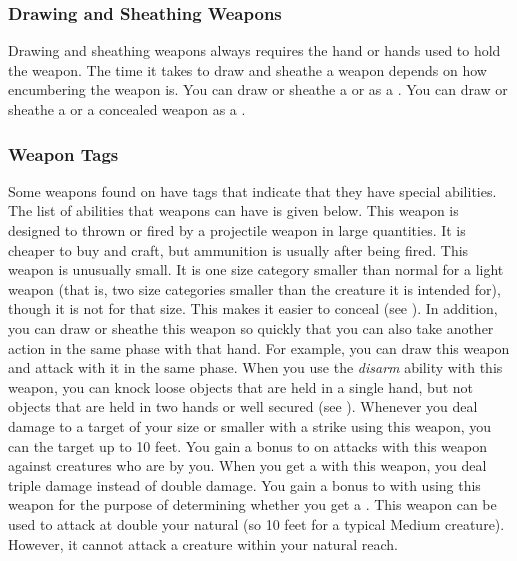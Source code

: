         \subsubsection{Drawing and Sheathing Weapons}\label{Drawing and Sheathing Weapons}
            Drawing and sheathing weapons always requires the hand or hands used to hold the weapon.
            The time it takes to draw and sheathe a weapon depends on how encumbering the weapon is.
            You can draw or sheathe a  or  as a .
            You can draw or sheathe a  or a concealed weapon as a .

        \subsubsection{Weapon Tags}\label{Weapon Tags}
            Some weapons found on  have tags that indicate that they have special abilities. The list of abilities that weapons can have is given below.
             This weapon is designed to thrown or fired by a projectile weapon in large quantities. It is cheaper to buy and craft, but ammunition is usually  after being fired.
             This weapon is unusually small.
            It is one size category smaller than normal for a light weapon (that is, two size categories smaller than the creature it is intended for), though it is not  for that size.
            This makes it easier to conceal (see ).
            In addition, you can draw or sheathe this weapon so quickly that you can also take another action in the same phase with that hand.
            For example, you can draw this weapon and attack with it in the same phase.
             When you use the \textit{disarm} ability with this weapon, you can knock loose objects that are held in a single hand, but not objects that are held in two hands or well secured (see ).
             Whenever you deal damage to a target of your size or smaller with a strike using this weapon, you can  the target up to 10 feet.
             You gain a  bonus to  on  attacks with this weapon against creatures who are \grappled by you.
             When you get a  with this weapon, you deal triple damage instead of double damage.
             You gain a  bonus to  with  using this weapon for the purpose of determining whether you get a .
            \label{Long Weapon} This weapon can be used to attack at double your natural  (so 10 feet for a typical Medium creature).
            However, it cannot attack a creature within your natural reach.

